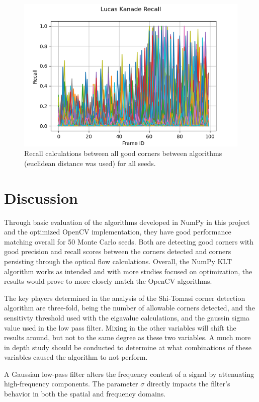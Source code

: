 \documentclass[11pt, conference, letterpaper]{IEEEtran}
\begin{document}
\begin{figure}[h!]
    \centering
    \includegraphics[width=\linewidth]{mc_images/mc_lk_recall.png}
    \caption{Recall calculations between all good corners between algorithms (euclidean distance was used) for all seeds.}
    \label{fig:mc_lk_rec}
\end{figure}

\section{Discussion}
Through basic evaluation of the algorithms developed in NumPy in this project and the optimized OpenCV implementation, they have good performance matching overall for 50 Monte Carlo seeds. Both are detecting good corners with good precision and recall scores between the corners detected and corners persisting through the optical flow calculations. Overall, the NumPy KLT algorithm works as intended and with more studies focused on optimization, the results would prove to more closely match the OpenCV algorithms.

The key players determined in the analysis of the Shi-Tomasi corner detection algorithm are three-fold, being the number of allowable corners detected, and the sensitivty threshold used with the eigavalue calculations, and the gaussin sigma value used in the low pass filter. Mixing in the other variables will shift the results around, but not to the same degree as these two variables. A much more in depth study should be conducted to determine at what combinations of these variables caused the algorithm to not perform.

A Gaussian low-pass filter alters the frequency content of a signal by attenuating high-frequency components. The parameter \(\sigma\) directly impacts the filter's behavior in both the spatial and frequency domains.
\end{document}
